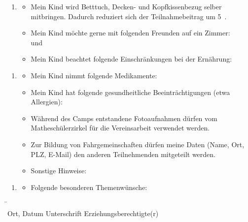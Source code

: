 \documentclass[13pt]{zettel}
\newenvironment{themabox}[1]{%
  \vspace{-0.8em}%
  \begin{enumerate}[labelindent=0pt,labelwidth=2.35cm,itemindent=0em,leftmargin=!,align=left]
    \item[\textbf{#1}]
      \begin{itemize}
}{\end{itemize}\end{enumerate}\vspace{-0.3em}}
\begin{document}
\begin{shaded}\begin{themabox}{Unterkunft}
\item Mein Kind wird Betttuch, Decken- und Kopfkissenbezug selber mitbringen.
Dadurch reduziert sich der Teilnahmebeitrag um 5~\texteuro{}.
\item Mein Kind möchte gerne mit folgenden Freunden auf ein Zimmer: \\[1em] \freistMittel \quad und \quad \freistMittel
\item Mein Kind beachtet folgende Einschränkungen bei der Ernährung: \\[1em]
\freist{13cm}
\end{themabox}\end{shaded}
\vspace{-0.5cm}

\begin{shaded}\begin{themabox}{Sonstiges}
\item Mein Kind nimmt folgende Medikamente:
\freist{5.4cm}
\item Mein Kind hat folgende gesundheitliche Beeinträchtigungen
(etwa Allergien): \\[1em] \freist{13cm}
\item Während des Camps entstandene Fotoaufnahmen dürfen
vom Matheschülerzirkel für die Vereinsarbeit verwendet werden.
\item Zur Bildung von Fahrgemeinschaften dürfen meine Daten (Name, Ort, PLZ,
E-Mail) den anderen Teilnehmenden mitgeteilt werden.
\item Sonstige Hinweise: \freist{10cm}
\end{themabox}
\end{shaded}
\vspace{-0.5cm}

\begin{shaded}\begin{themabox}{Mathe}
\item[] Folgende besonderen Themenwünsche:
\freist{6.85cm}
\end{themabox}
\end{shaded}

\begin{tabbing}
\freistMittel \qquad\qquad \= \kill
\freistMittel \> \freistLaenger \\
Ort, Datum \> Unterschrift Erziehungsberechtigte(r)
\end{tabbing}
\end{document}
